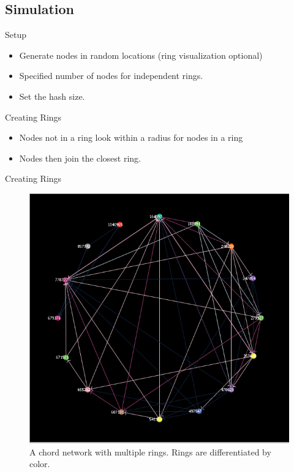 \documentclass{beamer}
\begin{document}
\subsection{Simulation}

\begin{frame}{Setup}
	\begin{itemize}
		\item Generate nodes in random locations (ring visualization optional)
		\item Specified number of nodes for independent rings. 
		\item Set the hash size.
	\end{itemize}
\end{frame}

\begin{frame}{Creating Rings}
	\begin{itemize}
		\item Nodes not in a ring look within a radius for nodes in a ring
		\item Nodes then join the closest ring.
	\end{itemize}
\end{frame}


\begin{frame}{Creating Rings}
	\begin{figure}
		\includegraphics[scale=0.33]{example_problem}
		\caption{A chord network with multiple rings.  Rings are differentiated by color.}
		\label{problem}
	\end{figure}
\end{frame}
\end{document}
